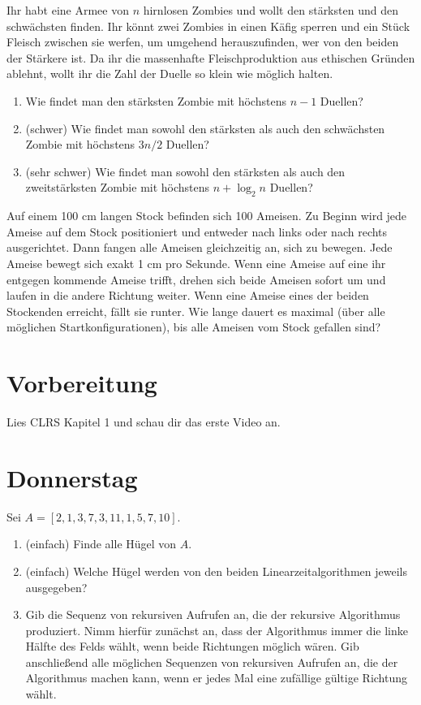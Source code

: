 \documentclass{uebung_cs}
\begin{document}
\begin{aufgabe}[Zombieduelle]
	Ihr habt eine Armee von $n$ hirnlosen Zombies und wollt den stärksten und den schwächsten finden. Ihr könnt zwei Zombies in einen Käfig sperren und ein Stück Fleisch zwischen sie werfen, um umgehend herauszufinden, wer von den beiden der Stärkere ist. Da ihr die massenhafte Fleischproduktion aus ethischen Gründen ablehnt, wollt ihr die Zahl der Duelle so klein wie möglich halten.
	\begin{enumerate}
		\item Wie findet man den stärksten Zombie mit höchstens $n-1$ Duellen?
		\item (schwer) Wie findet man sowohl den stärksten als auch den schwächsten Zombie mit höchstens $3n/2$ Duellen?
		\item (sehr schwer) Wie findet man sowohl den stärksten als auch den zweitstärksten Zombie mit höchstens $n+\log_2 n$ Duellen?
	\end{enumerate}
\end{aufgabe}

\begin{aufgabe}\label{tue-last}
	Auf einem 100 cm langen Stock befinden sich 100 Ameisen.
	Zu Beginn wird jede Ameise auf dem Stock positioniert und entweder nach links oder nach rechts ausgerichtet.
	Dann fangen alle Ameisen gleichzeitig an, sich zu bewegen.
	Jede Ameise bewegt sich exakt 1 cm pro Sekunde. Wenn eine Ameise auf eine ihr entgegen kommende Ameise trifft, drehen sich beide Ameisen sofort um und laufen in die andere Richtung weiter.
	Wenn eine Ameise eines der beiden Stockenden erreicht, fällt sie runter.
	Wie lange dauert es maximal (über alle möglichen Startkonfigurationen), bis alle Ameisen vom Stock gefallen sind?
\end{aufgabe}

\section*{Vorbereitung}
Lies CLRS Kapitel 1 und schau dir das erste Video an.

\section*{Donnerstag}
\begin{aufgabe}[Hügel]\label{thu-first}
	Sei $A = [2, 1, 3, 7, 3, 11, 1, 5, 7, 10]$.
	\begin{enumerate}
		\item (einfach) Finde alle Hügel von $A$.
		\item (einfach) Welche Hügel werden von den beiden Linearzeitalgorithmen jeweils ausgegeben?
		\item Gib die Sequenz von rekursiven Aufrufen an, die der rekursive Algorithmus produziert. Nimm hierfür zunächst an, dass der Algorithmus immer die linke Hälfte des Felds wählt, wenn beide Richtungen möglich wären. Gib anschließend alle möglichen Sequenzen von rekursiven Aufrufen an, die der Algorithmus machen kann, wenn er jedes Mal eine zufällige gültige Richtung wählt.
	\end{enumerate}
\end{aufgabe}
\end{document}
